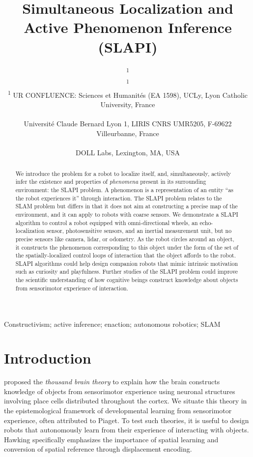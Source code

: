 \documentclass[pmlr]{jmlr}%
\title[SLAPI]{Simultaneous Localization and Active Phenomenon Inference (SLAPI)}
\author{\Name{Olivier L. Georgeon}\textsuperscript{1} \Email{ogeorgeon@univ-catholyon.fr}\\
  \Name{Juan R. Vidal}\textsuperscript{1} \Email{jvidal@univ-catholyon.fr}\\
  \addr \textsuperscript{1} UR CONFLUENCE: Sciences et Humanités (EA 1598), UCLy, Lyon Catholic University, France\\
  \Name{Titouan Knockaert} \Email{titouan.knockaert@gmail.com}\\
  \addr Université Claude Bernard Lyon 1, LIRIS CNRS UMR5205, F-69622 Villeurbanne, France\\
  \Name{Paul Robertson} \Email{paulr@dollabs.com}\\
  \addr DOLL Labs, Lexington, MA, USA\\
}
\begin{document}
\maketitle

\begin{abstract}
We introduce the problem for a robot to  localize itself, and, simultaneously, actively infer the existence and properties of \textit{phenomena} present in its surrounding environment: the SLAPI problem. 
A phenomenon is a representation of an entity ``as the robot experiences it'' through interaction. 
The SLAPI problem relates to the SLAM problem but differs in that it does not aim at constructing a precise map of the environment, and it can apply to robots with coarse sensors. 
We demonstrate a SLAPI algorithm to control a robot equipped with omni-directional wheels, an echo-localization sensor, photosensitive sensors, and an inertial measurement unit, but no precise sensors like camera, lidar, or odometry. 
As the robot circles around an object, it constructs the phenomenon corresponding to this object under the form of the set of the spatially-localized control loops of interaction that the object affords to the robot. 
SLAPI algorithms could help design companion robots that mimic intrinsic motivation such as curiosity and playfulness. 
Further studies of the SLAPI problem could improve the scientific understanding of how cognitive beings construct knowledge about objects from sensorimotor experience of interaction.
\end{abstract}

\begin{keywords}
Constructivism; active inference; enaction; autonomous robotics; SLAM
\end{keywords}

\section{Introduction}
\label{sec:intro}

\cite{hawkins_framework_2019} proposed the \textit{thousand brain theory} to explain how the brain constructs knowledge of objects from sensorimotor experience using neuronal structures involving place cells distributed throughout the cortex.
We situate this theory in the epistemological framework of developmental learning from sensorimotor experience, often attributed to Piaget.
To test such theories, it is useful to design robots that autonomously learn from their experience of interacting with objects.
Hawking specifically emphasizes the importance of spatial learning and conversion of spatial reference through displacement encoding. 
\end{document}
